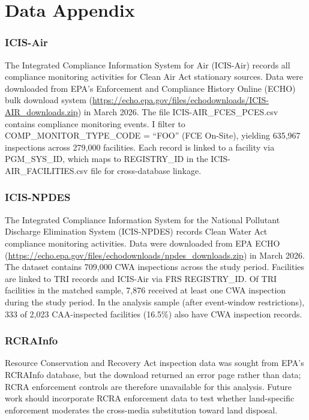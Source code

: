 \documentclass[12pt]{article}
\begin{document}
\label{apep_main_text_end}
\newpage



\newpage
\appendix

\section{Data Appendix}
\label{sec:data_appendix}

\subsubsection*{ICIS-Air} The Integrated Compliance Information System for Air (ICIS-Air) records all compliance monitoring activities for Clean Air Act stationary sources. Data were downloaded from EPA's Enforcement and Compliance History Online (ECHO) bulk download system (\url{https://echo.epa.gov/files/echodownloads/ICIS-AIR_downloads.zip}) in March 2026. The file ICIS-AIR\_FCES\_PCES.csv contains compliance monitoring events. I filter to COMP\_MONITOR\_TYPE\_CODE = ``FOO'' (FCE On-Site), yielding 635,967 inspections across 279,000 facilities. Each record is linked to a facility via PGM\_SYS\_ID, which maps to REGISTRY\_ID in the ICIS-AIR\_FACILITIES.csv file for cross-database linkage.

\subsubsection*{ICIS-NPDES} The Integrated Compliance Information System for the National Pollutant Discharge Elimination System (ICIS-NPDES) records Clean Water Act compliance monitoring activities. Data were downloaded from EPA ECHO (\url{https://echo.epa.gov/files/echodownloads/npdes_downloads.zip}) in March 2026. The dataset contains 709,000 CWA inspections across the study period. Facilities are linked to TRI records and ICIS-Air via FRS REGISTRY\_ID. Of TRI facilities in the matched sample, 7,876 received at least one CWA inspection during the study period. In the analysis sample (after event-window restrictions), 333 of 2,023 CAA-inspected facilities (16.5\%) also have CWA inspection records.

\subsubsection*{RCRAInfo} Resource Conservation and Recovery Act inspection data was sought from EPA's RCRAInfo database, but the download returned an error page rather than data; RCRA enforcement controls are therefore unavailable for this analysis. Future work should incorporate RCRA enforcement data to test whether land-specific enforcement moderates the cross-media substitution toward land disposal.
\end{document}
